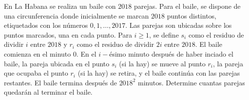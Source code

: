 En La Habana se realiza un baile con $2018$ parejas. Para el baile, se dispone de una circunferencia donde inicialmente se marcan $2018$ puntos distintos, etiquetados con los números $0,1,\ldots,2017$. Las parejas son ubicadas sobre los puntos marcados, una en cada punto. Para $i\ge1$, se define $s_i$ como el residuo de dividir $i$ entre $2018$ y $r_i$ como el residuo de dividir $2i$ entre $2018$. El baile comienza en el minuto $0$. En el $i-$ésimo minuto después de haber inciado el baile, la pareja ubicada en el punto $s_i$ (si la hay) se mueve al punto $r_i$, la pareja que ocupaba el punto $r_i$ (si la hay) se retira, y el baile continúa con las parejas restantes. El baile termina después de $2018^2$ minutos. Determine cuantas parejas quedarán al terminar el baile.
